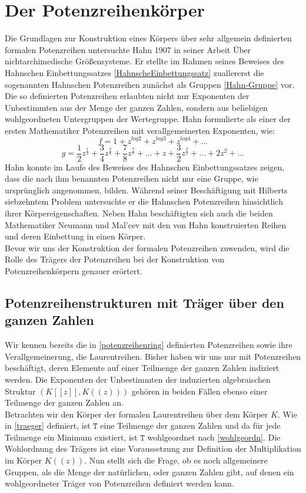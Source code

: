 \section{Der Potenzreihenkörper}
%
Die Grundlagen zur Konstruktion eines Körpers über sehr allgemein definierten formalen Potenzreihen untersuchte Hahn 1907 in seiner Arbeit \glqq Über nichtarchimedische Größensysteme\grqq. Er stellte im Rahmen seines Beweises des Hahnschen Einbettungssatzes \ref{HahnscheEinbettungssatz} zuallererst die sogenannten Hahnschen Potenzreihen zunächst als Gruppen \ref{Hahn-Gruppe} vor. Die so definierten Potenzreihen erlaubten nicht nur Exponenten der Unbestimmten aus der Menge der ganzen Zahlen, sondern aus beliebigen wohlgeordneten Untergruppen der Wertegruppe. Hahn formulierte als einer der ersten Mathematiker Potenzreihen mit verallgemeinerten Exponenten, wie:\\
\[ f = 1 + z^{log 2} + z^{log 3} + z^{log 4} + ... \]
\[g = \frac{1}{2}z^{\frac{1}{2}} + \frac{3}{4}z^\frac{3}{4} + \frac{7}{8}z^\frac{7}{8} + ... + z + \frac{3}{2}z^\frac{3}{2} + ... + 2z^2 + ...\] 
Hahn konnte im Laufe des Beweises des Hahnschen Einbettungssatzes zeigen, dass die nach ihm benannten Potenzreihen nicht nur eine Gruppe, wie ursprünglich angenommen, bilden.  Während seiner Beschäftigung mit Hilberts siebzehntem Problem untersuchte er die Hahnschen Potenzreihen hinsichtlich ihrer Körpereigenschaften. Neben Hahn beschäftigten sich auch die beiden Mathematiker Neumann und Mal'cev mit den von Hahn konstruierten Reihen und deren Einbettung in einen Körper. \\
Bevor wir uns der Konstruktion der formalen Potenzreihen zuwenden, wird die Rolle des Trägers der Potenzreihen bei der Konstruktion von Potenzreihenkörpern genauer erörtert. 

\subsection{Potenzreihenstrukturen mit Träger über den ganzen Zahlen}\label{traegerGanz}
Wir kennen bereits die in \ref{potenzreihenring} definierten Potenzreihen sowie ihre Verallgemeinerung, die Laurentreihen. Bisher haben wir uns nur mit Potenzreihen beschäftigt, deren Elemente auf einer Teilmenge der ganzen Zahlen indiziert werden. Die Exponenten der Unbestimmten der induzierten algebraischen Struktur $\left(K[[z]], K((z))\right) $ gehören in beiden Fällen ebenso einer Teilmenge der ganzen Zahlen an. \\
Betrachten wir den Körper der formalen Laurentreihen über dem Körper $K$. Wie in \ref{traeger} definiert, ist $\mathtt{T}$ eine Teilmenge der ganzen Zahlen und da für jede Teilmenge ein Minimum existiert, ist $\mathtt{T}$ wohlgeordnet nach \ref{wohlgeordn}. Die Wohlordnung des Trägers ist eine Voraussetzung zur Definition der Multiplikation im Körper $K((z))$. Nun stellt sich die Frage, ob es noch allgemeinere Gruppen, als die Menge der natürlichen, oder ganzen Zahlen gibt, auf denen ein wohlgeordneter Träger von Potenzreihen definiert werden kann.
%
%
